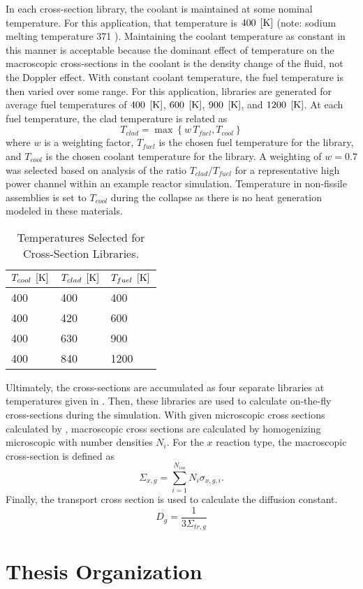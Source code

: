   In each cross-section library, the coolant is maintained at some nominal
  temperature. For this application, that temperature is $400 \;\left[\text{{K}}\right]$
  (note: sodium melting temperature 371 ). Maintaining the coolant
  temperature as constant in this manner is acceptable because the dominant 
  effect of temperature on the macroscopic cross-sections in the coolant is 
  the density change of the fluid, not the Doppler effect. With constant 
  coolant temperature, the fuel temperature is then varied over some range. 
  For this application, libraries are generated for average fuel temperatures
  of $400 \;\left[\text{{K}}\right]$, $600 \;\left[\text{{K}}\right]$, $900 \;\left[\text{{K}}\right]$, and $1200 \;\left[\text{{K}}\right]$.
  At each fuel temperature, the clad temperature is related as 
  \begin{equation}
    T_{clad} = \max \left\{ w \, T_{fuel}, T_{cool} \right\}
  \end{equation}
  where $w$ is a weighting factor, $T_{fuel}$ is the chosen fuel temperature
  for the library, and $T_{cool}$ is the chosen coolant temperature for the
  library. A weighting of $w=0.7$ was selected based on analysis of the ratio
  $T_{clad}/T_{fuel}$ for a representative high power channel
  within an example reactor simulation.  Temperature in non-fissile assemblies 
  is set to $T_{cool}$ during the collapse as there is no heat generation 
  modeled in these materials.

  \begin{table}
    \caption{Temperatures Selected for Cross-Section Libraries.}
    \label{tab:xstemps}
    \begin{center}
      \begin{tabular}{lll}
        \toprule
        $T_{cool} \;\left[\text{{K}}\right]$ & $T_{clad} \;\left[\text{{K}}\right]$ & $T_{fuel} \;\left[\text{{K}}\right]$ \\
        \midrule
        400 & 400 & 400  \\
        400 & 420 & 600  \\
        400 & 630 & 900  \\
        400 & 840 & 1200 \\
        \bottomrule
      \end{tabular}
    \end{center}
  \end{table}

  Ultimately, the cross-sections are accumulated as four separate libraries at
  temperatures given in . Then, these libraries are used to
  calculate on-the-fly cross-sections during the simulation.
  With given microscopic cross sections calculated by \mcc, macroscopic cross
  sections are calculated by homogenizing microscopic with number densities
  $N_i$.  For the $x$ reaction type, the macroscopic cross-section is defined
  as
  \begin{equation}
    \Sigma_{x,g} = \sum_{i=1}^{N_{iso}} N_i \sigma_{x,g,i}.
  \end{equation}
  Finally, the transport cross section is used to calculate the diffusion
  constant.
  \begin{equation}
    D_g = \frac{1}{3 \Sigma_{tr,g}}
  \end{equation}

\section{Thesis Organization}
